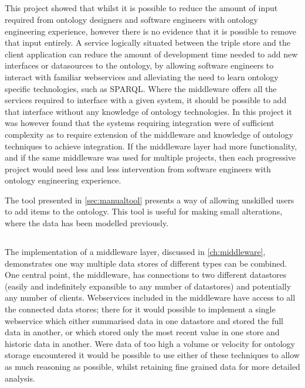 \subsection{\QuestionSkillz}
This project showed that whilst it is possible to reduce the amount of input required from ontology designers and software engineers with ontology engineering experience, however there is no evidence that it is possible to remove that input entirely. A service logically situated between the triple store and the client application can reduce the amount of development time needed to add new interfaces or datasources to the ontology, by allowing software engineers to interact with familiar webservices and alleviating the need to learn ontology specific technologies, such as SPARQL. Where the middleware offers all the services required to interface with a given system, it should be possible to add that interface without any knowledge of ontology technologies. In this project it was however found that the systems requiring integration were of sufficient complexity as to require extension of the middleware and knowledge of ontology techniques to achieve integration. If the middleware layer had more functionality, and if the same middleware was used for multiple projects, then each progressive project would need less and less intervention from software engineers with ontology engineering experience. 

The tool presented in \autoref{sec:manualtool} presents a way of allowing unskilled users to add items to the ontology. This tool is useful for making small alterations, where the data has been modelled previously. 

\subsection{\QuestionCombine}
The implementation of a middleware layer, discussed in \autoref{ch:middleware}, demonstrates one way multiple data stores of different types can be combined. One central point, the middleware, has connections to two different datastores (easily and indefinitely expansible to any number of datastores) and potentially any number of clients. Webservices included in the middleware have access to all the connected data stores; there for it would possible to implement a single webservice which either summarised data in one datastore and stored the full data in another, or which stored only the most recent value in one store and historic data in another. Were data of too high a volume or velocity for ontology storage encountered it would be possible to use either of these techniques to allow as much reasoning as possible, whilst retaining fine grained data for more detailed analysis. 

